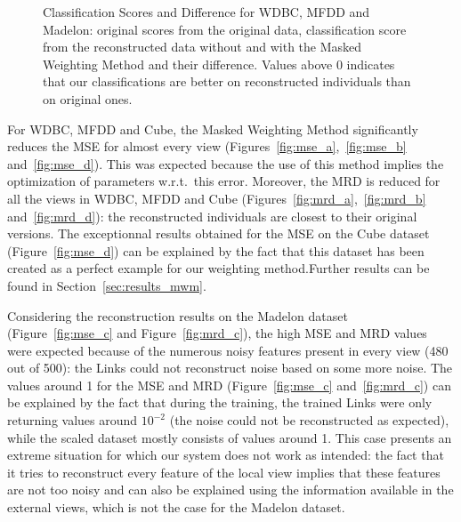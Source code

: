 \begin{figure}[h]
    \quad
    \caption{Classification Scores and Difference for WDBC, MFDD and
    Madelon: original scores from the original data, classification score from the reconstructed data without and with the Masked Weighting Method and their difference. Values above 0 indicates that our classifications are better on reconstructed individuals than on original ones.}
\end{figure}

For WDBC, MFDD and Cube, the Masked Weighting Method significantly reduces the MSE for almost every view (Figures~\ref{fig:mse_a},~\ref{fig:mse_b} and~\ref{fig:mse_d}). This was expected because the use of this method implies the optimization of parameters w.r.t.\ this error. Moreover, the MRD is reduced for all the views in WDBC, MFDD and Cube (Figures~\ref{fig:mrd_a},~\ref{fig:mrd_b} and~\ref{fig:mrd_d}): the reconstructed individuals are closest to their original versions. The exceptionnal results obtained for the MSE on the Cube dataset (Figure~\ref{fig:mse_d}) can be explained by the fact that this dataset has been created as a perfect example for our weighting method.\@ Further results can be found in Section~\ref{sec:results_mwm}.

Considering the reconstruction results on the Madelon dataset (Figure~\ref{fig:mse_c} and Figure~\ref{fig:mrd_c}), the high MSE and MRD values were expected because of the numerous noisy features present in every view (480 out of 500): the Links could not reconstruct noise based on some more noise. The values around 1 for the MSE and MRD (Figure~\ref{fig:mse_c} and~\ref{fig:mrd_c}) can be explained by the fact that during the training, the trained Links were only returning values around $10^{-2}$ (the noise could not be reconstructed as expected), while the scaled dataset mostly consists of values around 1. This case presents an extreme situation for which our system does not work as intended: the fact that it tries to reconstruct every feature of the local view implies that these features are not too noisy and can also be explained using the information available in the external views, which is not the case for the Madelon dataset.
	

